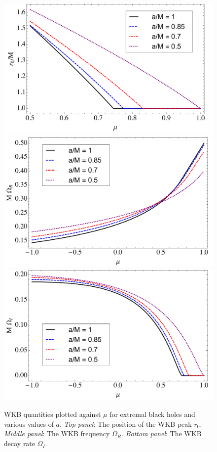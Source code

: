 \begin{refsection}
\begin{figure}[tb]
\includegraphics[width = 1.0 \columnwidth]{chapter_extremal/etc/KNPeak} \\
\includegraphics[width = 1.0 \columnwidth]{chapter_extremal/etc/KNOmegaR} \\
\includegraphics[width = 1.0 \columnwidth]{chapter_extremal/etc/ExKNDecay}
\caption{WKB quantities plotted against $\mu$ for extremal black holes and various values of $a$. {\it Top panel}: The position of the WKB peak $r_0$. {\it Middle panel}: The WKB frequency $\Omega_R$. {\it Bottom panel}: The WKB decay rate $\Omega_I$.}
\label{fig:ExWKB}
\end{figure}



\end{refsection}
